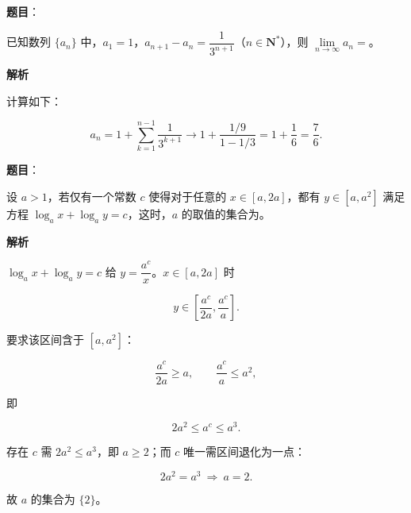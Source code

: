 \begin{answer}

\textbf{题目}：

已知数列 $\{a_n\}$ 中，$a_1=1$，$a_{n+1}-a_n=\dfrac1{3^{n+1}}$（$n\in\mathbf N^*$），则 $\lim\limits_{n\to\infty}a_n=$\gkblank{}。

\textbf{解析}

计算如下：

\nopagebreak[4]
\[a_n=1+\sum_{k=1}^{n-1}\frac1{3^{k+1}}\to1+\frac{1/9}{1-1/3}=1+\frac16=\frac76.\]


\end{answer}
\begin{answer}

\textbf{题目}：

设 $a>1$，若仅有一个常数 $c$ 使得对于任意的 $x\in[a,2a]$，都有 $y\in[a,a^2]$ 满足方程 $\log_ax+\log_ay=c$，这时，$a$ 的取值的集合为\gkblank{}。

\textbf{解析}

$\log_ax+\log_ay=c$ 给 $y=\dfrac{a^c}x$。$x\in[a,2a]$ 时

\nopagebreak[4]
\[y\in\left[\frac{a^c}{2a},\frac{a^c}a\right].\]

要求该区间含于 $[a,a^2]$：

\nopagebreak[4]
\[\frac{a^c}{2a}\geqslant a,\qquad \frac{a^c}a\leqslant a^2,\]

即

\nopagebreak[4]
\[2a^2\leqslant a^c\leqslant a^3.\]

存在 $c$ 需 $2a^2\leqslant a^3$，即 $a\geqslant2$；而 $c$ 唯一需区间退化为一点：

\nopagebreak[4]
\[2a^2=a^3\ \Longrightarrow\ a=2.\]

故 $a$ 的集合为 $\{2\}$。


\end{answer}
